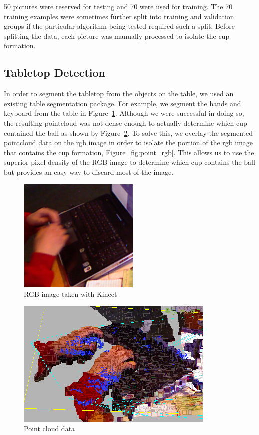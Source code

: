 \documentclass[letterpaper, 10 pt, conference]{ieeeconf}  %
\begin{document}
50 pictures were reserved for testing and 70 were used for training.  The 70 training examples were sometimes further split into training and validation groups if the particular algorithm being tested required such a split.  Before splitting the data, each picture was manually processed to isolate the cup formation.

\subsection{Tabletop Detection}


In order to segment the tabletop from the objects on the table, we used an existing table segmentation package.  For example, we segment the hands and keyboard from the table in Figure~\ref{fig:rgb}. Although we were successful in doing so, the resulting pointcloud was not dense enough to actually determine which cup contained the ball as shown by Figure~\ref{fig:point}.  To solve this, we overlay the segmented pointcloud data on the rgb image in order to isolate the portion of the rgb image that contains the cup formation, Figure~\ref{fig:point_rgb}.  This allows us to use the superior pixel density of the RGB image to determine which cup contains the ball but provides an easy way to discard most of the image.

\begin{figure}[thpb]
      \centering
	  \includegraphics[scale =0.5]{rgb}
      \caption{RGB image taken with Kinect}
      \label{fig:rgb}
\end{figure}

\begin{figure}[thpb]
      \centering
	  \includegraphics[scale =0.5]{point}
      \caption{Point cloud data}
      \label{fig:point}
\end{figure}
\end{document}

